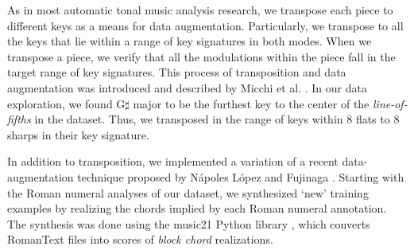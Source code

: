 

As in most automatic tonal music analysis research, we
transpose each piece to different keys as a means for data
augmentation. Particularly, we transpose to all the keys
that lie within a range of key signatures in both modes.
When we transpose a piece, we verify that all the
modulations within the piece fall in the target range of key
signatures. This process of transposition and data
augmentation was introduced and described by Micchi et al.
\parencite{micchi2020not}. In our data exploration, we found
G$\sharp$ major to be the furthest key to the center of the
\emph{line-of-fifths} \parencite{temperley2000line} in the
dataset. Thus, we transposed in the range of keys within 8
flats to 8 sharps in their key signature.


In addition to transposition, we implemented a variation of
a recent data-augmentation technique proposed by N\'apoles
L\'opez and Fujinaga \parencite{napoleslopez2020harmonic}.
Starting with the Roman numeral analyses of our dataset, we
synthesized `new' training examples by realizing the chords
implied by each Roman numeral annotation. The synthesis was
done using the music21 Python library
\parencite{cuthbert_music21_2010}, which converts RomanText
\parencite{gotham2019romantext} files into scores of \emph{block
chord} realizations.



